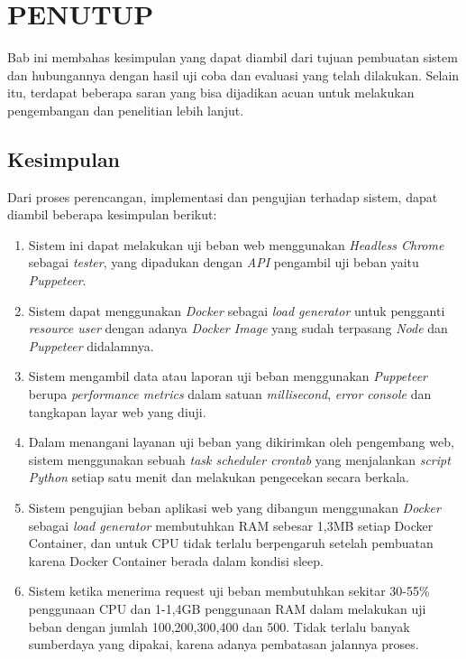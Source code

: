 \chapter{PENUTUP}
    Bab ini membahas kesimpulan yang dapat diambil dari tujuan pembuatan sistem dan hubungannya dengan hasil uji coba dan evaluasi yang telah dilakukan. Selain itu, terdapat beberapa saran yang bisa dijadikan acuan untuk melakukan pengembangan dan penelitian lebih lanjut.
        
	\section{Kesimpulan}
        Dari proses perencangan, implementasi dan pengujian terhadap sistem, dapat diambil beberapa kesimpulan berikut:
        \begin{enumerate}
        	\item Sistem ini dapat melakukan uji beban web menggunakan \textit{Headless Chrome} sebagai \textit{tester}, yang dipadukan dengan \textit{API} pengambil uji beban yaitu \textit{Puppeteer}.
        	
        	\item Sistem dapat menggunakan \textit{Docker} sebagai \textit{load generator} untuk pengganti \textit{resource user} dengan adanya \textit{Docker Image} yang sudah terpasang \textit{Node} dan \textit{Puppeteer} didalamnya.
        	
        	\item Sistem mengambil data atau laporan uji beban menggunakan \textit{Puppeteer} berupa \textit{performance metrics} dalam satuan \textit{millisecond}, \textit{error console} dan tangkapan layar web yang diuji.
        	
        	\item Dalam menangani layanan uji beban yang dikirimkan oleh pengembang web, sistem menggunakan sebuah \textit{task scheduler crontab} yang menjalankan \textit{script Python} setiap satu menit dan melakukan pengecekan secara berkala.
        	
        	\item Sistem pengujian beban aplikasi web yang dibangun menggunakan \textit{Docker} sebagai \textit{load generator} membutuhkan RAM sebesar 1,3MB setiap Docker Container, dan untuk CPU tidak terlalu berpengaruh setelah pembuatan karena Docker Container berada dalam kondisi sleep.
        	
        	\item Sistem ketika menerima request uji beban membutuhkan sekitar 30-55\% penggunaan CPU dan 1-1,4GB penggunaan RAM dalam melakukan uji beban dengan jumlah 100,200,300,400 dan 500. Tidak terlalu banyak sumberdaya yang dipakai, karena adanya pembatasan jalannya proses.
        \end{enumerate}
        
